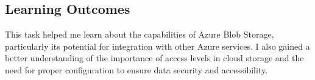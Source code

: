 \documentclass[10pt]{article}
\begin{document}
\vspace*{0.5cm}

\subsection{Learning Outcomes}
This task helped me learn about the capabilities of Azure Blob Storage,
particularly its potential for integration with other Azure services. I also
gained a better understanding of the importance of access levels in cloud
storage and the need for proper configuration to ensure data security and
accessibility.

	{\newpage}
\printbibliography{}
\end{document}

